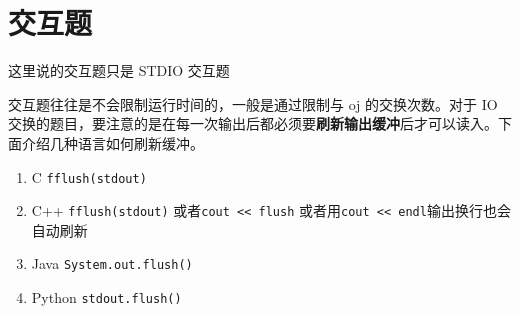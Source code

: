 \section{交互题}

这里说的交互题只是 STDIO 交互题

交互题往往是不会限制运行时间的，一般是通过限制与 oj 的交换次数。对于 IO 交换的题目，要注意的是在每一次输出后都必须要\textbf{刷新输出缓冲}后才可以读入。下面介绍几种语言如何刷新缓冲。
\begin{enumerate}
    \item C \verb|fflush(stdout)|
    \item C++ \verb|fflush(stdout)| 或者\verb|cout << flush| 或者用\verb|cout << endl|输出换行也会自动刷新
    \item Java \verb|System.out.flush()|
    \item Python \verb|stdout.flush()|
\end{enumerate}